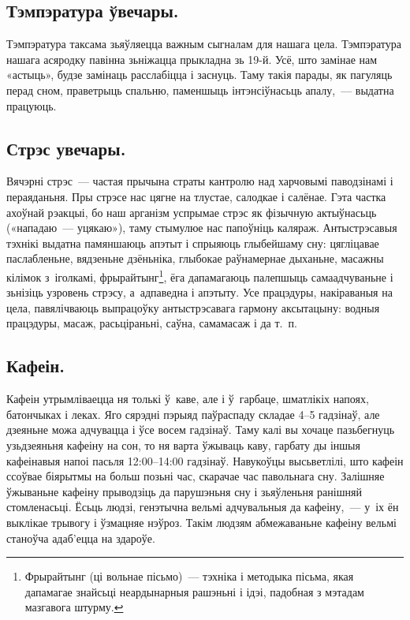 \subsection{Тэмпэратура ўвечары.}
Тэмпэратура таксама зьяўляецца важным сыгналам для нашага цела. Тэмпэратура нашага асяродку павінна зьніжацца прыкладна зь 19-й. Усё, што замінае нам «астыць», будзе замінаць расслабіцца і заснуць. Таму такія парады, як пагуляць перад сном, праветрыць спальню, паменшыць інтэнсіўнасьць апалу,~--- выдатна працуюць.

\subsection{Стрэс увечары.}
Вячэрні стрэс~--- частая прычына страты кантролю над харчовымі паводзінамі і пераяданьня. Пры стрэсе нас цягне на тлустае, салодкае і салёнае. Гэта частка ахоўнай рэакцыі, бо наш арганізм успрымае стрэс як фізычную актыўнасьць («нападаю~--- уцякаю»), таму стымулюе нас папоўніць каляраж. Антыстрэсавыя тэхнікі выдатна памяншаюць апэтыт і спрыяюць глыбейшаму сну: цягліцавае паслабленьне, вядзеньне дзёньніка, глыбокае раўнамернае дыханьне, масажны кілімок з~іголкамі, фрырайтынг\footnote{Фрырайтынг (ці вольнае пісьмо)~--- тэхніка і методыка пісьма, якая дапамагае знайсьці неардынарныя рашэньні і ідэі, падобная з мэтадам мазгавога штурму.}, ёга дапамагаюць палепшыць самаадчуваньне і зьнізіць узровень стрэсу, а~адпаведна і апэтыту. Усе працэдуры, накіраваныя на цела, павялічваюць выпрацоўку антыстрэсавага гармону аксытацыну: водныя працэдуры, масаж, расьціраньні, саўна, самамасаж і да т.~п.

\subsection{Кафеін.}
Кафеін утрымліваецца ня толькі ў~каве, але і ў~гарбаце, шматлікіх напоях, батончыках і леках. Яго сярэдні пэрыяд паўраспаду складае 4--5 гадзінаў, але дзеяньне можа адчувацца і ўсе восем гадзінаў. Таму калі вы хочаце пазьбегнуць узьдзеяньня кафеіну на сон, то ня варта ўжываць каву, гарбату ды іншыя кафеінавыя напоі пасьля 12:00–14:00 гадзінаў. Навукоўцы высьветлілі, што кафеін ссоўвае біярытмы на больш позьні час, скарачае час павольнага сну. Залішняе ўжываньне кафеіну прыводзіць да парушэньня сну і зьяўленьня ранішняй стомленасьці. Ёсьць людзі, генэтычна вельмі адчувальныя да кафеіну,~--- у~іх ён выклікае трывогу і ўзмацняе нэўроз. Такім людзям абмежаваньне кафеіну вельмі станоўча адаб'ецца на здароўе.

